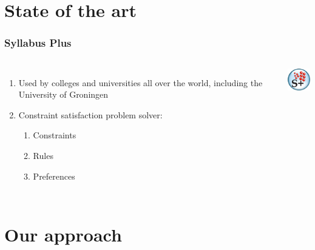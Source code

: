 \documentclass{beamer}
\begin{document}
\section{State of the art}
\begin{frame}
	\frametitle{Syllabus Plus}
	\begin{columns}%
    \begin{enumerate}
		\item Used by colleges and universities all over the world, including the University of Groningen
		\item Constraint satisfaction problem solver:
		\begin{enumerate}
			\item Constraints
			\item Rules
			\item Preferences
		\end{enumerate}
	\end{enumerate}
    \includegraphics[width=\textwidth]{SyllabusPlus.png}
    \end{columns}	
\end{frame}

\section{Our approach}
\end{document}
